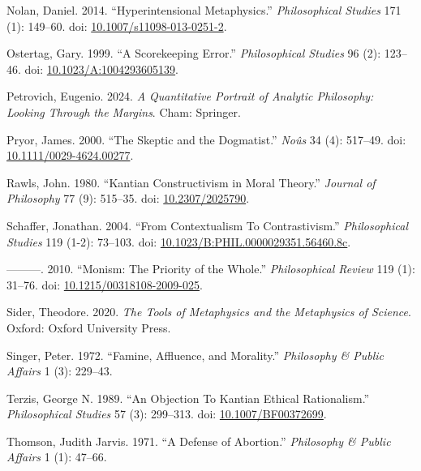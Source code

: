 \documentclass[
  11pt,
  letterpaper,
  DIV=11,
  numbers=noendperiod,
  twoside]{scrartcl}
\newlength{\cslhangindent}
\newenvironment{CSLReferences}[2] %
 {\begin{list}{}{%
  \setlength{\itemindent}{0pt}
  \setlength{\leftmargin}{0pt}
  \setlength{\parsep}{0pt}
  \ifodd #1
   \setlength{\leftmargin}{\cslhangindent}
   \setlength{\itemindent}{-1\cslhangindent}
  \fi
  \setlength{\itemsep}{#2\baselineskip}}}
 {\end{list}}
\begin{document}
\begin{CSLReferences}{1}{0}
Nolan, Daniel. 2014. {``Hyperintensional Metaphysics.''}
\emph{Philosophical Studies} 171 (1): 149--60. doi:
\href{https://doi.org/10.1007/s11098-013-0251-2}{10.1007/s11098-013-0251-2}.

Ostertag, Gary. 1999. {``A Scorekeeping Error.''} \emph{Philosophical
Studies} 96 (2): 123--46. doi:
\href{https://doi.org/10.1023/A:1004293605139}{10.1023/A:1004293605139}.

Petrovich, Eugenio. 2024. \emph{A Quantitative Portrait of Analytic
Philosophy: Looking Through the Margins}. Cham: Springer.

Pryor, James. 2000. {``The Skeptic and the Dogmatist.''} \emph{Noûs} 34
(4): 517--49. doi:
\href{https://doi.org/10.1111/0029-4624.00277}{10.1111/0029-4624.00277}.

Rawls, John. 1980. {``Kantian Constructivism in Moral Theory.''}
\emph{Journal of Philosophy} 77 (9): 515--35. doi:
\href{https://doi.org/10.2307/2025790}{10.2307/2025790}.

Schaffer, Jonathan. 2004. {``From Contextualism To Contrastivism.''}
\emph{Philosophical Studies} 119 (1-2): 73--103. doi:
\href{https://doi.org/10.1023/B:PHIL.0000029351.56460.8c}{10.1023/B:PHIL.0000029351.56460.8c}.

---------. 2010. {``Monism: The Priority of the Whole.''}
\emph{Philosophical Review} 119 (1): 31--76. doi:
\href{https://doi.org/10.1215/00318108-2009-025}{10.1215/00318108-2009-025}.

Sider, Theodore. 2020. \emph{The Tools of Metaphysics and the
Metaphysics of Science}. Oxford: Oxford University Press.

Singer, Peter. 1972. {``Famine, Affluence, and Morality.''}
\emph{Philosophy \& Public Affairs} 1 (3): 229--43.

Terzis, George N. 1989. {``An Objection To Kantian Ethical
Rationalism.''} \emph{Philosophical Studies} 57 (3): 299--313. doi:
\href{https://doi.org/10.1007/BF00372699}{10.1007/BF00372699}.

Thomson, Judith Jarvis. 1971. {``A Defense of Abortion.''}
\emph{Philosophy \& Public Affairs} 1 (1): 47--66.


\end{CSLReferences}
\end{document}
